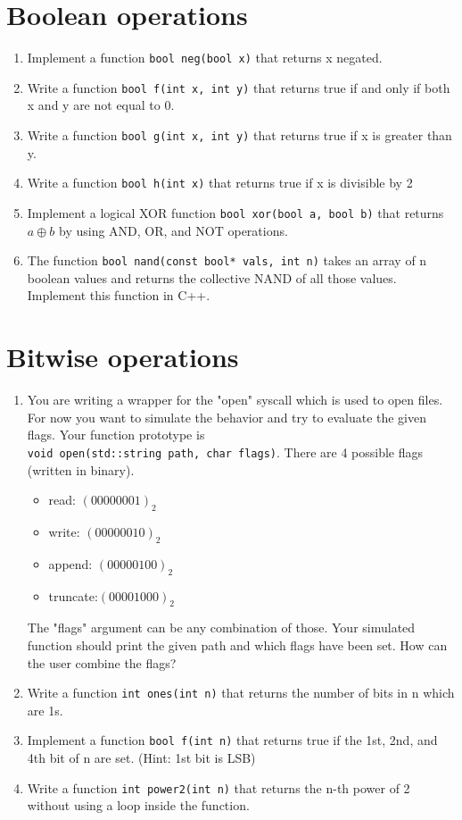\documentclass[12pt, a4paper]{article}
\begin{document}
\section*{Boolean operations}
\begin{enumerate}
    \item Implement a function \lstinline{bool neg(bool x)} that returns x negated.
    \item Write a function \lstinline{bool f(int x, int y)} that returns true if and only if both x and y are not equal to 0.
    \item Write a function  \lstinline{bool g(int x, int y)} that returns true if x is greater than y.
    \item Write a function \lstinline{bool h(int x)} that returns true if x is divisible by 2
    \item Implement a logical XOR function \lstinline{bool xor(bool a, bool b)} that returns $ a \oplus b $ by using AND, OR, and NOT operations.
    \item The function \lstinline{bool nand(const bool* vals, int n)} takes an array of n boolean values and returns the collective NAND of all those values. Implement this function in C++.
\end{enumerate}
\section*{Bitwise operations}
\begin{enumerate}
    \item You are writing a wrapper for the "open" syscall which is used to open files. For now you want to simulate the behavior and try to evaluate the given flags. Your function prototype is \\
    \lstinline{void open(std::string path, char flags)}. There are 4 possible flags (written in binary).
    \begin{itemize}
        \item read: $ (00000001)_2 $
        \item write: $ (00000010)_2 $
        \item append: $ (00000100)_2 $
        \item truncate:$ (00001000)_2 $
    \end{itemize}
    The "flags" argument can be any combination of those. Your simulated function should print the given path and which flags have been set. How can the user combine the flags?
    \item Write a function \lstinline{int ones(int n)} that returns the number of bits in n which are 1s.
    \item Implement a function \lstinline{bool f(int n)} that returns true if the 1st, 2nd, and 4th bit of n are set. (Hint: 1st bit is LSB)
    \item Write a function \lstinline{int power2(int n)} that returns the n-th power of 2 without using a loop inside the function.
\end{enumerate}
\end{document}
